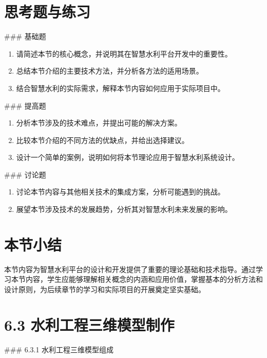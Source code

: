 \section{思考题与练习}

\#\#\# 基础题

\begin{enumerate}
\def\labelenumi{\arabic{enumi}.}
\tightlist
\item
  请简述本节的核心概念，并说明其在智慧水利平台开发中的重要性。
\item
  总结本节介绍的主要技术方法，并分析各方法的适用场景。
\item
  结合智慧水利的实际需求，解释本节内容如何应用于实际项目中。
\end{enumerate}

\#\#\# 提高题

\begin{enumerate}
\def\labelenumi{\arabic{enumi}.}
\setcounter{enumi}{3}
\tightlist
\item
  分析本节涉及的技术难点，并提出可能的解决方案。
\item
  比较本节介绍的不同方法的优缺点，并给出选择建议。
\item
  设计一个简单的案例，说明如何将本节理论应用于智慧水利系统设计。
\end{enumerate}

\#\#\# 讨论题

\begin{enumerate}
\def\labelenumi{\arabic{enumi}.}
\setcounter{enumi}{6}
\tightlist
\item
  讨论本节内容与其他相关技术的集成方案，分析可能遇到的挑战。
\item
  展望本节涉及技术的发展趋势，分析其对智慧水利未来发展的影响。
\end{enumerate}

\section{本节小结}

本节内容为智慧水利平台的设计和开发提供了重要的理论基础和技术指导。通过学习本节内容，学生应能够理解相关概念的内涵和应用价值，掌握基本的分析方法和设计原则，为后续章节的学习和实际项目的开展奠定坚实基础。

\section{6.3 水利工程三维模型制作}

\#\#\# 6.3.1 水利工程三维模型组成

